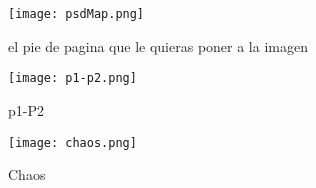 \graphicspath{{../Graphics/Cpt3-CombInject/}}


			\begin{figure}[H]
				\centering
				\texttt{[image: psdMap.png]}
				\caption{\label{Img:widgets}el pie de pagina que le quieras 	poner a la imagen}
			\end{figure}

			\begin{figure}[H]
				\centering
				\texttt{[image: p1-p2.png]}
				\caption{\label{fig:p1-p2}p1-P2}	
			\end{figure}

			\begin{figure}[H]
				\centering
				\texttt{[image: chaos.png]}
				\caption{\label{fig:chaos}Chaos}	
			\end{figure}

